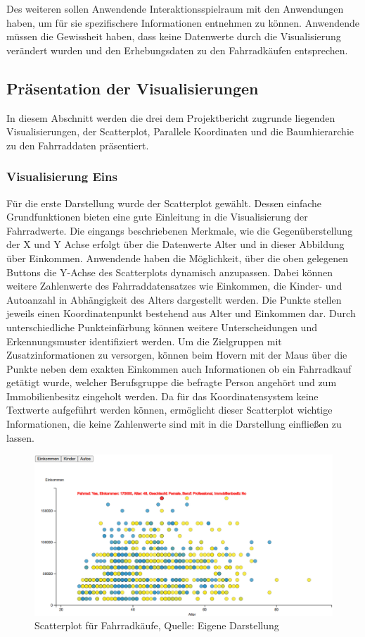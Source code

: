 \documentclass[usegeometry=true]{scrartcl}
\begin{document}
Des weiteren sollen Anwendende Interaktionsspielraum mit den Anwendungen haben, um für sie spezifischere Informationen entnehmen zu können. Anwendende müssen die Gewissheit haben, dass keine Datenwerte durch die Visualisierung verändert wurden und den Erhebungsdaten zu den Fahrradkäufen entsprechen. 
\subsection{Präsentation der Visualisierungen}
In diesem Abschnitt werden die drei dem Projektbericht zugrunde liegenden Visualisierungen, der Scatterplot, Parallele Koordinaten und die Baumhierarchie zu den Fahrraddaten präsentiert. 
\subsubsection{Visualisierung Eins}
Für die erste Darstellung wurde der Scatterplot gewählt. Dessen einfache Grundfunktionen bieten eine gute Einleitung in die Visualisierung der Fahrradwerte. Die eingangs beschriebenen Merkmale, wie die Gegenüberstellung der X und Y Achse erfolgt über die Datenwerte Alter und in dieser Abbildung über Einkommen. Anwendende haben die Möglichkeit, über die oben gelegenen Buttons die Y-Achse des Scatterplots dynamisch anzupassen. Dabei können weitere Zahlenwerte des Fahrraddatensatzes wie Einkommen, die Kinder- und Autoanzahl in Abhängigkeit des Alters dargestellt werden. Die Punkte stellen jeweils einen Koordinatenpunkt bestehend aus Alter und Einkommen dar. Durch unterschiedliche Punkteinfärbung können weitere Unterscheidungen und Erkennungsmuster identifiziert werden. 
Um die Zielgruppen mit Zusatzinformationen zu versorgen, können beim Hovern mit der Maus über die Punkte neben dem exakten Einkommen auch Informationen ob ein Fahrradkauf getätigt wurde, welcher Berufsgruppe die befragte Person angehört und zum Immobilienbesitz eingeholt werden.
Da für das Koordinatensystem keine Textwerte aufgeführt werden können, ermöglicht dieser Scatterplot wichtige Informationen, die keine Zahlenwerte sind mit in die Darstellung einfließen zu lassen.  
\begin{figure}[h]
\begin{center}
\includegraphics[width=16cm]{Bilder/V1Scatterplot.png}
\caption{Scatterplot für Fahrradkäufe, Quelle: Eigene Darstellung}
\end{center}
\end{figure}
\end{document}
